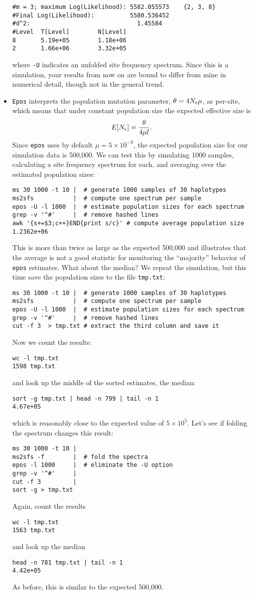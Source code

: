 \documentclass[a4paper, english]{article}
\newcommand{\ty}{\texttt}
\begin{document}
\begin{itemize}
\begin{verbatim}
#m = 3; maximum Log(Likelihood): 5582.055573	{2, 3, 8}
#Final Log(Likelihood):          5580.536452
#d^2:                              1.45584
#Level  T[Level]        N[Level]
8       5.19e+05        1.18e+06
2       1.66e+06        3.32e+05
\end{verbatim}
where \ty{-U} indicates an unfolded site frequency spectrum. Since
this is a simulation, your results from now on are bound to differ
from mine in
numerical detail, though not in the general trend.
\item \ty{Epos} interprets the population mutation parameter,
$\theta=4N_{\rm e}\mu$, as per-site, which means that under constant
population size the expected effective size is
\[
E[N_{\rm e}]=\frac{\theta}{4\mu l}.
\]
Since \ty{epos} uses by default $\mu=5\times 10^{-9}$, the expected
population size for our simulation data is 500,000. We can
test this by simulating 1000 samples, calculating a site frequency
spectrum for each, and averaging over the estimated population
sizes:
\begin{verbatim}
ms 30 1000 -t 10 |  # generate 1000 samples of 30 haplotypes
ms2sfs           |  # compute one spectrum per sample
epos -U -l 1000  |  # estimate population sizes for each spectrum
grep -v '^#'     |  # remove hashed lines
awk '{s+=$3;c++}END{print s/c}' # compute average population size
1.2362e+06
\end{verbatim}
This is more than twice as large as the expected 500,000 and
illustrates that the average is not a good statistic for monitoring
the ``majority'' behavior of \ty{epos} estimates. What about the
median? We repeat the simulation, but this time save the population
sizes to the file \ty{tmp.txt}:
\begin{verbatim}
ms 30 1000 -t 10 |  # generate 1000 samples of 30 haplotypes
ms2sfs           |  # compute one spectrum per sample
epos -U -l 1000  |  # estimate population sizes for each spectrum
grep -v '^#'     |  # remove hashed lines
cut -f 3  > tmp.txt # extract the third column and save it
\end{verbatim}
Now we count the results:
\begin{verbatim}
wc -l tmp.txt 
1598 tmp.txt
\end{verbatim}
and look up the middle of the sorted estimates, the median:
\begin{verbatim}
sort -g tmp.txt | head -n 799 | tail -n 1
4.67e+05
\end{verbatim}
which is reasonably close to the expected value of $5\times
10^5$. 
Let's see if folding the
spectrum changes this result:
\begin{verbatim}
ms 30 1000 -t 10 | 
ms2sfs -f        |  # fold the spectra 
epos -l 1000     |  # eliminate the -U option
grep -v '^#'     |
cut -f 3         |
sort -g > tmp.txt
\end{verbatim}
Again, count the results
\begin{verbatim}
wc -l tmp.txt 
1563 tmp.txt
\end{verbatim}
and look up the median
\begin{verbatim}
head -n 781 tmp.txt | tail -n 1
4.42e+05
\end{verbatim}
As before, this is similar to the expected 500,000. 
\end{itemize}
\end{document}
